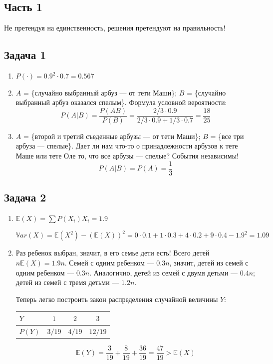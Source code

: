 \documentclass[a4paper,12pt]{article}
\theoremstyle{plain}                         %
\theoremstyle{definition}                  %
\theoremstyle{remark}                      %
\begin{document}
\begin{center}
\section*{Часть 1}
\end{center}
Не претендуя на единственность, решения претендуют на правильность!

\subsection*{Задача 1}
\renewcommand{\labelenumi}{(\alph{enumi})}
\begin{enumerate}
\item $P(\cdot) = 0.9^2\cdot 0.7 = 0.567  $
\item $A$ = \{случайно выбранный арбуз --- от тети Маши\}; $B$ = \{случайно выбранный арбуз оказался спелым\}. Формула условной вероятности:
$$P(A|B) = \dfrac{P(AB)}{P(B)}= \dfrac{2/3 \cdot 0.9}{2/3 \cdot 0.9 + 1/3 \cdot 0.7} =\dfrac{18}{25}$$
\item $A$ = \{второй и третий съеденные арбузы --- от тети Маши\}; $B$ = \{все три арбуза --- спелые\}. Дает ли нам что-то о принадлежности арбузов к тете Маше или тете Оле то, что все арбузы --- спелые? События независимы!
$$P(A|B) = P(A) = \dfrac{1}{3}$$
\end{enumerate}

\subsection*{Задача 2}
\begin{enumerate}
\item $\mathbb{E}(X) = \sum P(X_i) X_i = 1.9$

$\mathbb{V}ar(X) = \mathbb{E}(X^2) - (\mathbb{E}(X))^2 = 0\cdot 0.1 + 1 \cdot 0.3 + 4 \cdot 0.2 + 9 \cdot 0.4 - 1.9^2 = 1.09$

\item Раз ребенок выбран, значит, в его семье дети есть! Всего детей $n\mathbb{E}(X) = 1.9n$. Семей с одним ребенком --- $0.3n$, значит, детей из семей с одним ребенком --- $0.3n$. Аналогично, детей из семей с двумя детьми --- $0.4n$; детей из семей с тремя детьми --- $1.2n$. 

Теперь легко построить закон распределения случайной величины $Y$:
\begin{table}[h]
\begin{tabular}{l|c|c|c}
$Y$    & $1$                & $2$                & $3$                \\ \hline
$P(Y)$ & $3/19$ & $4/19$ & $12/19$
\end{tabular}
\end{table}

$$\mathbb{E}(Y) = \dfrac{3}{19} + \dfrac{8}{19} + \dfrac{36}{19} = \dfrac{47}{19} > \mathbb{E}(X)$$

\end{enumerate}
\end{document}
